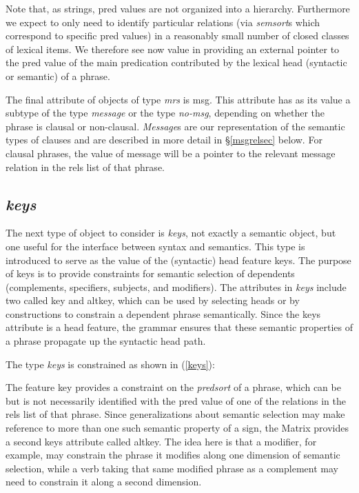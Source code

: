\documentclass[12pt]{article}
\newcommand{\es}{\enumsentence}
\begin{document}
Note that, as strings, {\sc pred} values are not organized into a hierarchy.
Furthermore we expect to only need to identify particular relations
(via {\it semsort}s which correspond to specific {\sc pred} values)
in a reasonably small number of closed classes of lexical items.
We therefore see now value in providing an external pointer to the
{\sc pred} value of the main predication contributed by the lexical
head (syntactic or semantic) of a phrase.


The final attribute of objects of type {\it mrs} is {\sc msg}.
This attribute has as its value a subtype of the type {\it message} 
or the type {\it no-msg}, depending on whether the phrase is clausal
or non-clausal.  {\it Message}s are our representation of the 
semantic types of clauses and are described in more detail in
\S\ref{msgrelsec} below.  For clausal phrases, the value of {\sc message}
will be a pointer to the relevant message relation in the {\sc rels} list
of that phrase.  


\subsection{{\it keys}}
\label{keysec}

The next type of object to consider is {\it keys}, not exactly a semantic
object, but one useful for the interface between syntax and semantics.  
This type is
introduced to serve as the value of the (syntactic) {\sc head} feature 
{\sc keys}. 
The purpose of {\sc keys} is to provide constraints for semantic
selection of dependents (complements, specifiers, subjects, and
modifiers).  The attributes in {\it keys} include two called {\sc key}
and {\sc altkey}, which can be used by selecting heads or by constructions
to constrain a dependent phrase semantically.
Since the {\sc keys} attribute is a {\sc head} feature,
the grammar ensures that these semantic properties of a phrase
propagate up the syntactic head path.

The type {\it keys} is constrained as shown in (\ref{keys}):

\es{\label{keys}
\begin{avm}
\[ key & predsort \\
   altkey & predsort \]
\end{avm}
}

The feature {\sc key} provides a constraint on the {\it predsort} of a phrase,
which can be but is not necessarily identified with the {\sc pred} value of one
of the relations in the {\sc rels} list of that phrase.  Since generalizations
about semantic selection may make reference to more than one such semantic
property of a sign, the Matrix provides a second {\sc keys} attribute called
{\sc altkey}.  The idea here is that a modifier, for example, may constrain the
phrase it modifies along one dimension of semantic selection, while a verb
taking that same modified phrase as a complement may need to constrain it along
a second dimension.
\end{document}

